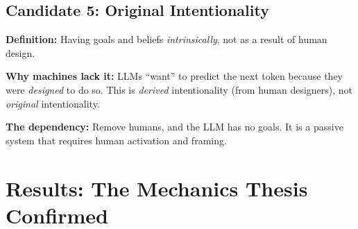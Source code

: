 \subsection{Candidate 5: Original Intentionality}

\textbf{Definition:} Having goals and beliefs \textit{intrinsically}, not as a result of human design.

\textbf{Why machines lack it:} LLMs ``want'' to predict the next token because they were \textit{designed} to do so. This is \textit{derived} intentionality (from human designers), not \textit{original} intentionality.

\textbf{The dependency:} Remove humans, and the LLM has no goals. It is a passive system that requires human activation and framing.


\section{Results: The Mechanics Thesis Confirmed}
\label{sec:hi-results}

